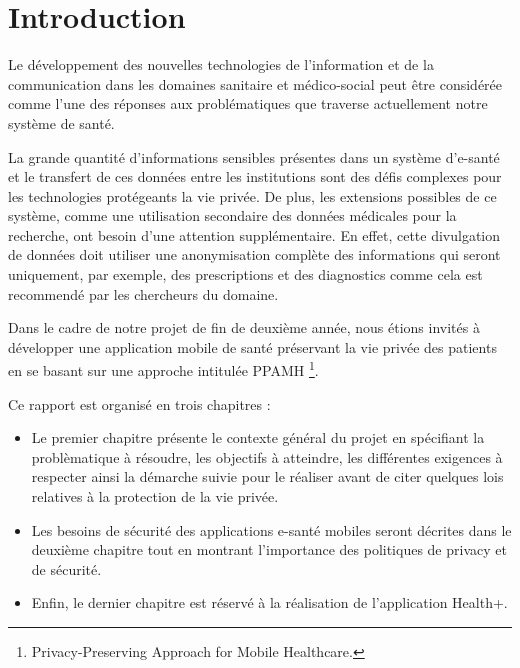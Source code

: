 
\chapter*{Introduction}

Le développement des nouvelles technologies de l’information et de la communication dans les domaines sanitaire et médico-social peut être considérée comme l’une des réponses aux problématiques que traverse actuellement notre système de santé.

\vspace{6pt}
\paragraphmark

La grande quantité d’informations sensibles présentes dans un système d'e-santé et le transfert de ces données entre les institutions sont des défis complexes pour les technologies protégeants la vie privée. De plus, les extensions possibles de ce système, comme une utilisation secondaire des données médicales pour la recherche, ont besoin d’une attention supplémentaire. En effet, cette divulgation de données doit utiliser une anonymisation complète des informations qui seront uniquement, par exemple, des prescriptions et des diagnostics comme cela est recommendé par les chercheurs du domaine.

\vspace{6pt}
\paragraphmark

Dans le cadre de notre projet de fin de deuxième année, nous étions invités à développer une application mobile de santé préservant la vie privée des patients en se basant sur une approche intitulée PPAMH \footnote{Privacy-Preserving Approach for Mobile Healthcare.}.

\vspace{6pt}
\paragraphmark

Ce rapport est organisé en trois chapitres :

\vspace{6pt}
\paragraphmark

\begin{itemize}
	\item 
Le premier chapitre présente le contexte général du projet en spécifiant la problèmatique à résoudre, les objectifs à atteindre, les différentes exigences à respecter ainsi la démarche suivie pour le réaliser avant de citer quelques lois relatives à la protection de la vie privée.
	\item
Les besoins de sécurité des applications e-santé mobiles seront décrites dans le deuxième chapitre tout en montrant l'importance des politiques de privacy et de sécurité.
	\item
Enfin, le dernier chapitre est réservé à la réalisation de l'application Health+.
\end{itemize}

